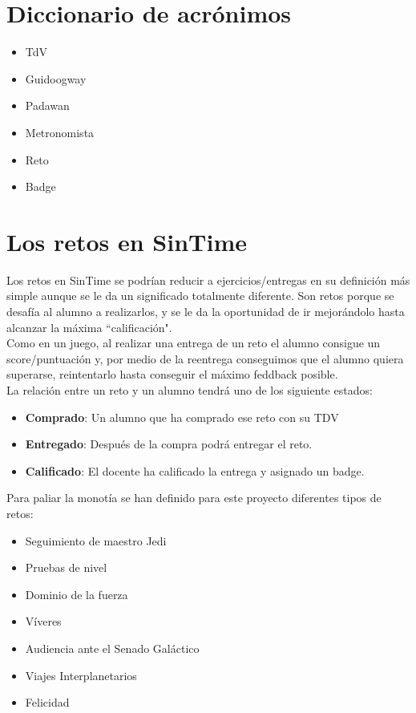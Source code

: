 \section{Diccionario de acrónimos}
\begin{itemize}
\item \ac{TdV}
\item \ac{Guidoogway}
\item \ac{Padawan}
\item \ac{Metronomista}
\item \ac{Reto}
\item \ac{Badge}
\end{itemize}

\section{Los retos en SinTime}
Los retos en SinTime se podrían reducir a ejercicios/entregas en su definición más simple aunque se le da un significado totalmente diferente. Son retos porque se desafía al alumno a realizarlos, y se le da la oportunidad de ir mejorándolo hasta alcanzar la máxima ``calificación".\\

Como en un juego, al realizar una entrega de un reto el alumno consigue un score/puntuación y, por medio de la reentrega conseguimos que el alumno quiera superarse, reintentarlo hasta conseguir el máximo feddback posible.\\

La relación entre un reto y un alumno tendrá uno de los siguiente estados:
\begin{itemize}
	\item \textbf{Comprado}: Un alumno que ha comprado ese reto con su TDV
	\item \textbf{Entregado}: Después de la compra podrá entregar el reto.
	\item \textbf{Calificado}: El docente ha calificado la entrega y asignado un badge.
\end{itemize}

Para paliar la monotía se han definido para este proyecto diferentes tipos de retos:

\begin{itemize}
	\item Seguimiento de maestro Jedi
	\item Pruebas de nivel
	\item Dominio de la fuerza
	\item Víveres
	\item Audiencia ante el Senado Galáctico
	\item Viajes Interplanetarios
	\item Felicidad
\end{itemize}

